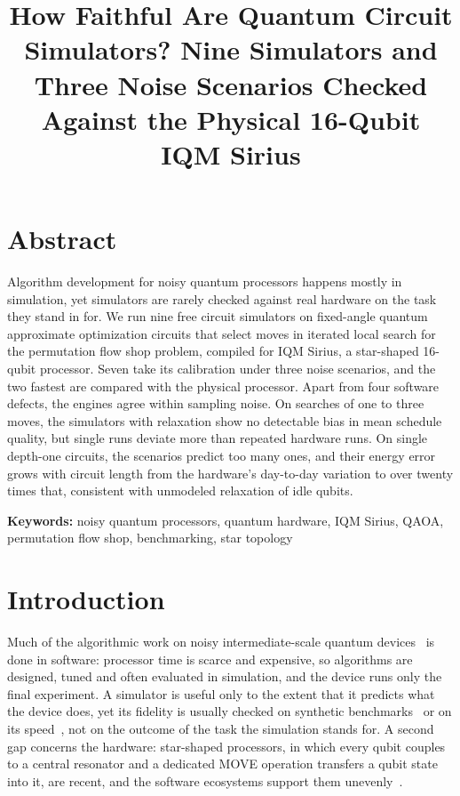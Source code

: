 \documentclass{scspaperproc}
\begin{document}
\def\SCSconferencename{Annual Modeling and Simulation Conference}
\def\SCSconferenceacro{ANNSIM'27}
\def\SCSpublicationyear{2027}
\def\SCSconferenceeditors{A. Bany Abdelnabi, J. Jabbour, S. Mustafiz, and R. Idzikowski}
\def\SCSconferencedates{May 17-21}
\def\SCSconferencevenue{Wroc{\l}aw University of Science and Technology, Wroc{\l}aw, Poland}

\author{}
\title{How Faithful Are Quantum Circuit Simulators? Nine Simulators and Three
Noise Scenarios Checked Against the Physical 16-Qubit IQM Sirius}

\maketitle

\section*{Abstract}
Algorithm development for noisy quantum processors happens mostly in simulation, yet simulators are
rarely checked against real hardware on the task they stand in for. We run nine free circuit
simulators on fixed-angle quantum approximate optimization circuits that select moves in iterated
local search for the permutation flow shop problem, compiled for IQM Sirius, a star-shaped 16-qubit
processor. Seven take its calibration under three noise scenarios, and the two fastest are
compared with the physical processor. Apart from four software defects, the engines agree within
sampling noise. On searches of one to three moves, the simulators with relaxation show no detectable
bias in mean schedule quality, but single runs deviate more than repeated hardware runs. On single
depth-one circuits, the scenarios predict too many ones, and their energy error grows with circuit
length from the hardware's day-to-day variation to over twenty times that, consistent with
unmodeled relaxation of idle qubits.

\textbf{Keywords:} noisy quantum processors, quantum hardware, IQM Sirius, QAOA, permutation flow shop, benchmarking, star topology

\section{Introduction}

Much of the algorithmic work on noisy intermediate-scale quantum
devices~\cite{preskill2018} is done in software: processor time is scarce and
expensive, so algorithms are designed, tuned and often evaluated in
simulation, and the device runs only the final experiment. A simulator is
useful only to the extent that it predicts what the device does, yet its
fidelity is usually checked on synthetic benchmarks~\cite{li2023qasmbench} or
on its speed~\cite{jamadagni2024bench}, not on the outcome of the task the
simulation stands for. A second gap concerns the hardware: star-shaped
processors, in which every qubit couples to a central resonator and a
dedicated MOVE operation transfers a qubit state into it, are recent, and the software ecosystems support them
unevenly~\cite{gnatowski2026routing}.
\end{document}
